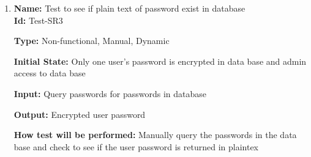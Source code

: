 \documentclass[12pt, titlepage]{article}
\begin{document}
\begin{enumerate}
    					
    					
    
    \item{\textbf{Name:} Test to see if plain text of password exist in database\\} \label{Test-SR3}
    \textbf{Id:} Test-SR3
    
    \textbf{Type:} Non-functional, Manual, Dynamic
    					
    \textbf{Initial State:} Only one user's password is encrypted in data base and admin access to data base
    					
    \textbf{Input:} Query passwords for passwords in database
    					
    \textbf{Output:} Encrypted user password
    					
    \textbf{How test will be performed:} Manually query the passwords in the data base and check to see if the user password is returned in plaintex
\end{enumerate}
\end{document}
